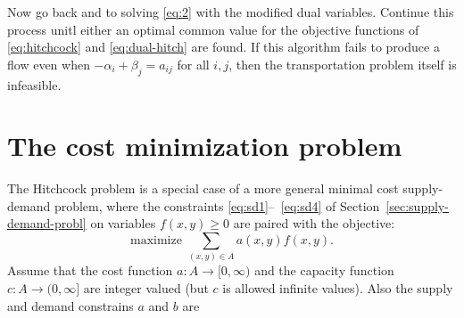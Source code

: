 \documentclass{amsbook}
\theoremstyle{definition}
\theoremstyle{remark}
\begin{document}
Now go back and to solving \eqref{eq:2} with the modified dual variables.
Continue this process unitl either an optimal common value for the objective functions of \eqref{eq:hitchcock} and \eqref{eq:dual-hitch} are found.
If this algorithm fails to produce a flow even when $-\alpha_i+\beta_j=a_{ij}$ for all $i,j$, then the transportation problem itself is infeasible. 
\section{The cost minimization problem}
\label{sec:cost-minim-probl}
The Hitchcock problem is a special case of a more general minimal cost supply-demand problem, where the constraints \eqref{eq:sd1}--~\eqref{eq:sd4} of Section~\ref{sec:supply-demand-probl} on variables $f(x,y)\geq 0$ are paired with the objective:
\begin{displaymath}
  \text{maximize } \sum_{(x,y)\in A} a(x,y) f(x,y).
\end{displaymath}
Assume that the cost function $a:A\to [0,\infty)$ and the capacity function $c:A\to (0,\infty]$ are integer valued (but $c$ is allowed infinite values).
Also the supply and demand constrains $a$ and $b$ are 


\end{document}
